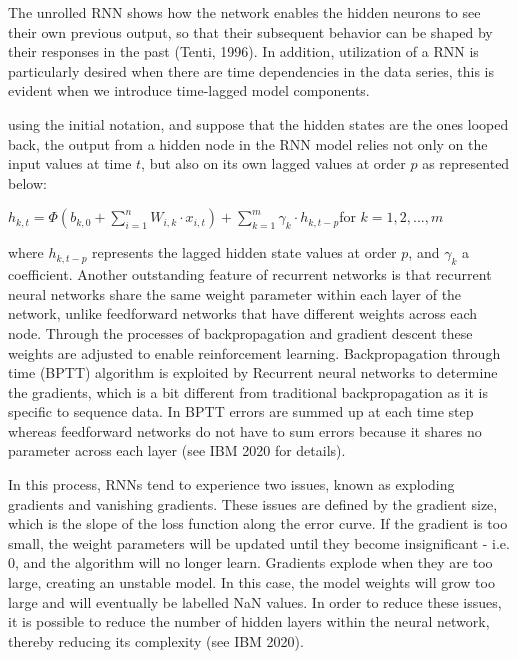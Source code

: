 \documentclass[a4paper,11pt,oneside]{book}
\begin{document}
The unrolled RNN shows how the network enables the hidden neurons to see their
own previous output, so that their subsequent behavior can be shaped by their responses in the past (Tenti, 1996). In addition, utilization of a RNN is particularly desired when there are
time dependencies in the data series, this is evident when we introduce time-lagged model components.

using the initial notation, and suppose that the hidden states are the ones looped
back, the output from a hidden node in the RNN model relies not only on the input values at
time $t$, but also on its own lagged values at order $p$ as represented below:

\begin{center}
	$h_{k,t} =\Phi(b_{k,0} + \sum_{i=1}^{n} W_{i,k} \cdot x_{i,t}) + \sum_{k=1}^{m} \gamma_{k} \cdot h_{k,t-p}$for $k = 1,2,...,m$
\end{center}

where $h_{k,t-p}$ represents the lagged hidden state values at order $p$, and $\gamma_{k}$ a coefficient. Another outstanding feature of recurrent networks is that recurrent neural networks share the same weight parameter within each layer of the network, unlike feedforward networks that have different weights across each node. Through the processes of backpropagation and gradient descent these weights are adjusted to enable reinforcement learning.  Backpropagation through time (BPTT) algorithm is exploited by Recurrent neural networks to determine the gradients, which is a bit different from traditional backpropagation as it is specific to sequence data. In BPTT errors are summed up at each time step whereas feedforward networks do not have to sum errors because it shares no parameter across each layer (see IBM 2020 for details).\newline\newline

In this process, RNNs tend to experience two issues, known as exploding gradients and vanishing gradients. These issues are defined by the gradient size, which is the slope of the loss function along the error curve. If the gradient is too small, the weight parameters will be updated until they become insignificant - i.e. 0, and the algorithm will no longer learn. Gradients explode when they are too large, creating an unstable model. In this case, the model weights will grow too large and will eventually be labelled NaN values. In order to reduce these issues, it is possible to reduce the number of hidden layers within the neural network, thereby reducing its complexity (see IBM 2020).
\end{document}
